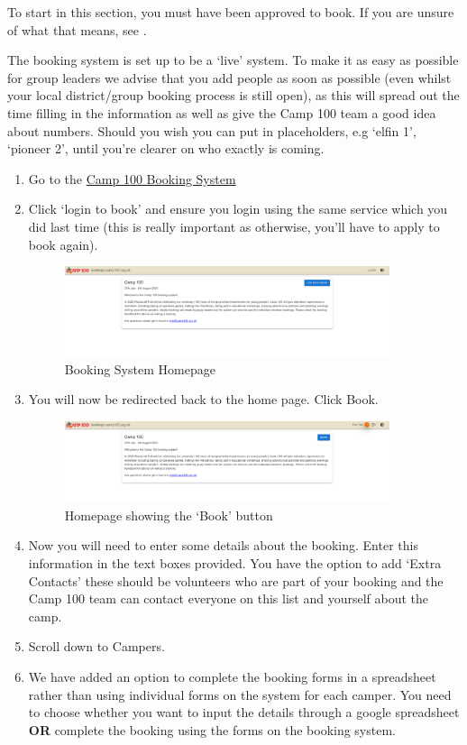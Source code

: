 \documentclass[a4paper, 11pt]{report}
\begin{document}
To start in this section, you must have been approved to book. If you are unsure of what that means, see .

The booking system is set up to be a `live' system. To make it as easy as possible for group leaders we advise that you add people as soon as possible (even whilst your local district/group booking process is still open), as this will spread out the time filling in the information as well as give the Camp 100 team a good idea about numbers. Should you wish you can put in placeholders, e.g `elfin 1', `pioneer 2', until you're clearer on who exactly is coming.

\begin{enumerate}
    \item Go to the \href{https://bookings.camp100.org.uk}{Camp 100 Booking System}
    \item Click `login to book' and ensure you login using the same service which you did last time (this is really important as otherwise, you'll have to apply to book again).
    \begin{figure}[H]
        \centering
        \includegraphics[width=0.9\textwidth]{assets/2-home-prelogin.png}
        \caption{Booking System Homepage}
    \end{figure}
    \item You will now be redirected back to the home page. Click Book.
    \begin{figure}[H]
        \centering
        \includegraphics[width=0.9\textwidth]{assets/2-home-loggedin.png}
        \caption{Homepage showing the `Book' button}
    \end{figure}
    \item Now you will need to enter some details about the booking. Enter this information in the text boxes provided. You have the option to add `Extra Contacts' these should be volunteers who are part of your booking and the Camp 100 team can contact everyone on this list and yourself about the camp.
    \item Scroll down to Campers.
    \item We have added an option to complete the booking forms in a spreadsheet rather than using individual forms on the system for each camper. You need to choose whether you want to input the details through a google spreadsheet \textbf{OR} complete the booking using the forms on the booking system. 
    

\end{enumerate}
\end{document}
